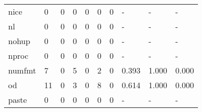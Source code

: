 \begin{longtable}{lp{2.0cm}p{2.0cm}p{2.0cm}p{2.0cm}p{2.0cm}p{2.0cm}p{2.0cm}p{2.0cm}p{2.0cm}}
nice      &                      0 &                                             0 &                                            0 &                                           0 &                                            0 &                                          0 &                                    - &                                      - &                                    - \\
nl        &                      0 &                                             0 &                                            0 &                                           0 &                                            0 &                                          0 &                                    - &                                      - &                                    - \\
nohup     &                      0 &                                             0 &                                            0 &                                           0 &                                            0 &                                          0 &                                    - &                                      - &                                    - \\
nproc     &                      0 &                                             0 &                                            0 &                                           0 &                                            0 &                                          0 &                                    - &                                      - &                                    - \\
numfmt    &                      7 &                                             0 &                                            5 &                                           0 &                                            2 &                                          0 &                                0.393 &                                  1.000 &                                0.000 \\
od        &                     11 &                                             0 &                                            3 &                                           0 &                                            8 &                                          0 &                                0.614 &                                  1.000 &                                0.000 \\
paste     &                      0 &                                             0 &                                            0 &                                           0 &                                            0 &                                          0 &                                    - &                                      - &                                    - \\

\end{longtable}

